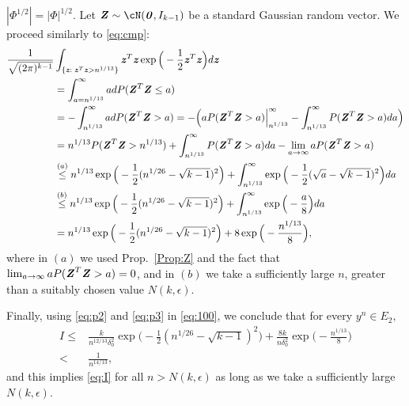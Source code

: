 \documentclass[11pt,onecolumn]{IEEEtran}
\def\mathbi#1{{\textbf{\textit #1}}}
\begin{document}
$|\Phi^{1/2}| = |\Phi|^{1/2}$.
Let $\mathbi{Z} \sim \cN(\mathbi{0}, I_{k-1})$ be a standard Gaussian random vector. 
   We proceed similarly to \eqref{eq:cmp}:
\begin{align}
 \frac{1}{\sqrt{(2\pi)^{k-1}}}&\int_{\{\mathbi{z}: \;\mathbi{z}^T \mathbi{z} > n^{1/13 } \} }  \mathbi{z}^T \mathbi{z} 
   \exp\Big( - \frac{1}{2} \mathbi{z}^T \mathbi{z} \Big) d\mathbi{z} \nonumber\\
    &= \int_{a = n^{1/13 }}^\infty a d P( \mathbi{Z}^T\mathbi{Z} \le a) \nonumber\\
& = - \int_{n^{1/13 }}^\infty a d P( \mathbi{Z}^T\mathbi{Z} > a)
= - \Big(  a P( \mathbi{Z}^T\mathbi{Z} > a) \Big|_{n^{1/13 }}^{\infty} 
- \int_{n^{1/13 }}^\infty P( \mathbi{Z}^T\mathbi{Z} > a) da \Big) \nonumber\\
& = n^{1/13 } P( \mathbi{Z}^T\mathbi{Z} > n^{1/13 })
+ \int_{n^{1/13 }}^\infty P( \mathbi{Z}^T\mathbi{Z} > a) da - \lim_{a\to\infty}a P( \mathbi{Z}^T\mathbi{Z} > a) \nonumber\\
&\overset{(a)}{\le}  n^{1/13 } \exp\Big(-\frac{1}{2}(n^{1/ 26 } - \sqrt{k-1})^2 \Big)
+  \int_{n^{1/13 }}^\infty  \exp\Big(-\frac{1}{2}( \sqrt{a} - \sqrt{k-1})^2 \Big) da \nonumber\\
&\overset{(b)}{\le}  n^{1/13 } \exp\Big(-\frac{1}{2}(n^{1/ 26 } - \sqrt{k-1})^2 \Big)
+ \int_{n^{1/13 }}^\infty  \exp\Big(-\frac{a}{8} \Big) da \nonumber\\
& = n^{1/13 } \exp\Big(-\frac{1}{2}(n^{1/ 26 } - \sqrt{k-1})^2 \Big)
+ 8 \exp \Big(-\frac{n^{1/13 }}{8} \Big), \label{eq:p3}
\end{align}
where in $(a)$ we used Prop.~\ref{Prop:Z} and the fact that $\lim_{a\to\infty}a P( \mathbi{Z}^T\mathbi{Z} > a)=0$, and in $(b)$ we take a sufficiently large $n$, greater than a suitably chosen value $N(k,\epsilon).$

Finally, using \eqref{eq:p2} and \eqref{eq:p3} in \eqref{eq:100}, we conclude that for every $y^n \in E_2,$
\begin{align*}
I\le &  \frac{k}{n^{12/13} \delta_0^2} \exp\Big(-\frac{1}{2}(n^{1/ 26 } - \sqrt{k-1})^2 \Big)
+ \frac{8k}{n \delta_0^2} \exp \Big(-\frac{n^{1/13 }}{8} \Big) \\
< & \frac{1}{n^{14/13}},
\end{align*}
and this implies \eqref{eq:I} for all $n>N(k,\epsilon)$ as long as we take a sufficiently large $N(k,\epsilon)$.
\end{document}
